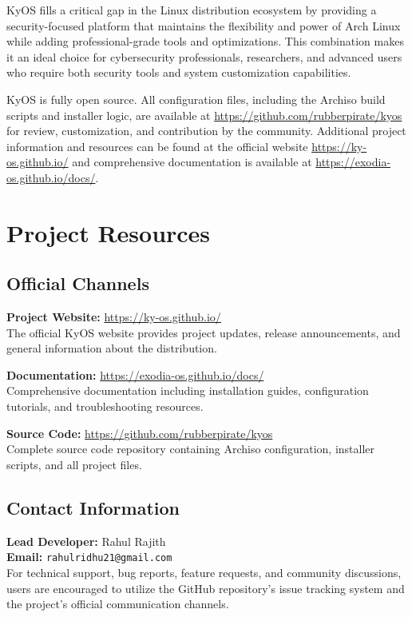 \documentclass[12pt,a4paper]{article}
\begin{document}
KyOS fills a critical gap in the Linux distribution ecosystem by providing a security-focused platform that maintains the flexibility and power of Arch Linux while adding professional-grade tools and optimizations. This combination makes it an ideal choice for cybersecurity professionals, researchers, and advanced users who require both security tools and system customization capabilities.

KyOS is fully open source. All configuration files, including the Archiso build scripts and installer logic, are available at \url{https://github.com/rubberpirate/kyos} for review, customization, and contribution by the community. Additional project information and resources can be found at the official website \url{https://ky-os.github.io/} and comprehensive documentation is available at \url{https://exodia-os.github.io/docs/}.

\section{Project Resources}

\subsection{Official Channels}
\textbf{Project Website:} \url{https://ky-os.github.io/} \\
The official KyOS website provides project updates, release announcements, and general information about the distribution.

\textbf{Documentation:} \url{https://exodia-os.github.io/docs/} \\
Comprehensive documentation including installation guides, configuration tutorials, and troubleshooting resources.

\textbf{Source Code:} \url{https://github.com/rubberpirate/kyos} \\
Complete source code repository containing Archiso configuration, installer scripts, and all project files.

\subsection{Contact Information}
\textbf{Lead Developer:} Rahul Rajith \\
\textbf{Email:} \texttt{rahulridhu21@gmail.com} \\

For technical support, bug reports, feature requests, and community discussions, users are encouraged to utilize the GitHub repository's issue tracking system and the project's official communication channels.
\end{document}
